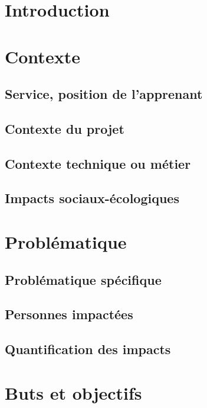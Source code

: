 \documentclass[a4paper]{article}
\begin{document}
\newpage
\section{Introduction}

\newpage
\section{Contexte}

\subsection{Service, position de l'apprenant}

\subsection{Contexte du projet}

\subsection{Contexte technique ou métier}

\subsection{Impacts sociaux-écologiques}

\newpage
\section{Problématique}

\subsection{Problématique spécifique}

\subsection{Personnes impactées}

\subsection{Quantification des impacts}

\newpage
\section{Buts et objectifs}
\end{document}
